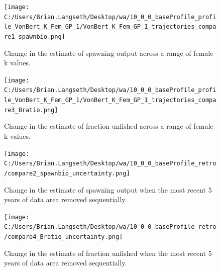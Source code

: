 \documentclass[11pt,
  english,
  a4paper,
]{article}
\begin{document}
\begin{figure}
\centering
\texttt{[image: C:/Users/Brian.Langseth/Desktop/wa/10\_0\_0\_baseProfile\_profile\_VonBert\_K\_Fem\_GP\_1/VonBert\_K\_Fem\_GP\_1\_trajectories\_compare1\_spawnbio.png]}
\caption{Change in the estimate of spawning output across a range of female k values.\label{fig:k-ssb}}
\end{figure}

\tagmcend\tagstructend


\begin{figure}
\centering
\texttt{[image: C:/Users/Brian.Langseth/Desktop/wa/10\_0\_0\_baseProfile\_profile\_VonBert\_K\_Fem\_GP\_1/VonBert\_K\_Fem\_GP\_1\_trajectories\_compare3\_Bratio.png]}
\caption{Change in the estimate of fraction unfished across a range of female k values.\label{fig:k-depl}}
\end{figure}

\tagmcend\tagstructend


\begin{figure}
\centering
\texttt{[image: C:/Users/Brian.Langseth/Desktop/wa/10\_0\_0\_baseProfile\_retro/compare2\_spawnbio\_uncertainty.png]}
\caption{Change in the estimate of spawning output when the most recent 5 years of data area removed sequentially.\label{fig:retro-ssb}}
\end{figure}

\tagmcend\tagstructend


\begin{figure}
\centering
\texttt{[image: C:/Users/Brian.Langseth/Desktop/wa/10\_0\_0\_baseProfile\_retro/compare4\_Bratio\_uncertainty.png]}
\caption{Change in the estimate of fraction unfished when the most recent 5 years of data area removed sequentially.\label{fig:retro-depl}}
\end{figure}

\tagmcend\tagstructend

\newpage
\end{document}
